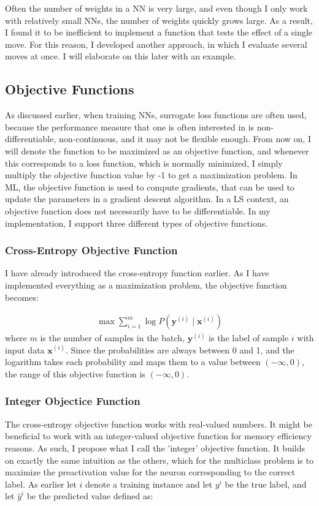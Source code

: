 \noindent Often the number of weights in a NN is very large, and even though I only work with relatively small NNs, the number of weights quickly grows large. As a result, I found it to be inefficient to implement a function that tests the effect of a single move. For this reason, I developed another approach, in which I evaluate several moves at once. I will elaborate on this later with an example. 

\subsection{Objective Functions}
As discussed earlier, when training NNs, surrogate loss functions are often used, because the performance measure that one is often interested in is non-differentiable, non-continuous, and it may not be flexible enough. From now on, I will denote the function to be maximized as an objective function, and whenever this corresponds to a loss function, which is normally minimized, I simply multiply the objective function value by -1 to get a maximization problem. In ML, the objective function is used to compute gradients, that can be used to update the parameters in a gradient descent algorithm. In a LS context, an objective function does not necessarily have to be differentiable. In my implementation, I support three different types of objective functions.

\subsubsection{Cross-Entropy Objective Function}
I have already introduced the cross-entropy function earlier. As I have implemented everything as a maximization problem, the objective function becomes:

\begin{align}
    \label{cs} \max \sum_{i=1}^m \log P(\mathbf{y}^{(i)} \mid \mathbf{x}^{(i)})
\end{align}
where $m$ is the number of samples in the batch, $\mathbf{y}^{(i)}$ is the label of sample $i$ with input data $\mathbf{x}^{(i)}$. Since the probabilities are always between 0 and 1, and the logarithm takes each probability and maps them to a value between $(-\infty, 0)$, the range of this objective function is $(-\infty, 0)$. 

\subsubsection{Integer Objectice Function}
The cross-entropy objective function works with real-valued numbers. It might be beneficial to work with an integer-valued objective function for memory efficiency reasons. As such, I propose what I call the 'integer' objective function. It builds on exactly the same intuition as the others, which for the multiclass problem is to maximize the preactivation value for the neuron corresponding to the correct label. As earlier let $i$ denote a training instance and let $y^i$ be the true label, and let $\hat{y}^i$ be the predicted value defined as:

